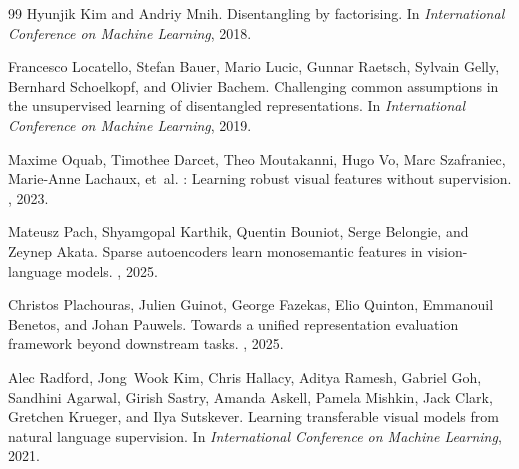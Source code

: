 \documentclass[10pt,twocolumn]{article}
\begin{document}
\begin{thebibliography}{99}
Hyunjik Kim and Andriy Mnih.
\newblock Disentangling by factorising.
\newblock In {\em International Conference on Machine Learning}, 2018.

Francesco Locatello, Stefan Bauer, Mario Lucic, Gunnar Raetsch, Sylvain Gelly,
  Bernhard Schoelkopf, and Olivier Bachem.
\newblock Challenging common assumptions in the unsupervised learning of
  disentangled representations.
\newblock In {\em International Conference on Machine Learning}, 2019.

Maxime Oquab, Timothee Darcet, Theo Moutakanni, Hugo Vo, Marc Szafraniec,
  Marie-Anne Lachaux, et~al.
: Learning robust visual features without supervision.
, 2023.

Mateusz Pach, Shyamgopal Karthik, Quentin Bouniot, Serge Belongie, and Zeynep
  Akata.
\newblock Sparse autoencoders learn monosemantic features in vision-language
  models.
, 2025.

Christos Plachouras, Julien Guinot, George Fazekas, Elio Quinton, Emmanouil
  Benetos, and Johan Pauwels.
\newblock Towards a unified representation evaluation framework beyond
  downstream tasks.
, 2025.

Alec Radford, Jong~Wook Kim, Chris Hallacy, Aditya Ramesh, Gabriel Goh,
  Sandhini Agarwal, Girish Sastry, Amanda Askell, Pamela Mishkin, Jack Clark,
  Gretchen Krueger, and Ilya Sutskever.
\newblock Learning transferable visual models from natural language
  supervision.
\newblock In {\em International Conference on Machine Learning}, 2021.

\end{thebibliography}
\end{document}
